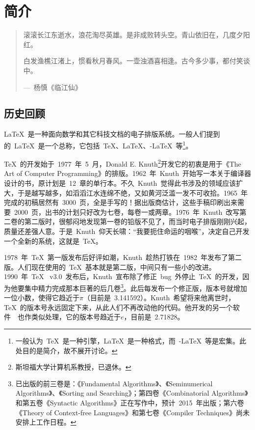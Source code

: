 \chapter{简介}

\begin{quotation}
滚滚长江东逝水，浪花淘尽英雄。是非成败转头空。青山依旧在，几度夕阳红。

白发渔樵江渚上，惯看秋月春风。一壶浊酒喜相逢。古今多少事，都付笑谈中。
\begin{flushright}
---~杨慎《临江仙》
\end{flushright}
\end{quotation}

\section{历史回顾}

\LaTeX~是一种面向数学和其它科技文档的电子排版系统。一般人们提到的~\LaTeX~是一个总称，它包括~\TeX、\LaTeX、\AmS-\LaTeX~等\footnote{一般认为~\TeX~是一种引擎，\LaTeX~是一种格式，而~\AmS-\LaTeX~等是宏集。此处目的是简介，故不展开讨论。}。

\TeX~的开发始于~1977~年~5~月，Donald E. Knuth\footnote{斯坦福大学计算机系教授，已退休。}开发它的初衷是用于《The Art of Computer Programming》的排版。1962~年~Knuth~开始写一本关于编译器设计的书，原计划是~12~章的单行本。不久~Knuth~觉得此书涉及的领域应该扩大，于是越写越多，如滔滔江水连绵不绝，又如黄河泛滥一发不可收拾。1965~年完成的初稿居然有~3000~页，全是手写的！据出版商估计，这些手稿印刷出来需要~2000~页，出书的计划只好改为七卷，每卷一或两章。1976~年~Knuth~改写第二卷的第二版时，很郁闷地发现第一卷的铅版不见了，而当时电子排版刚刚兴起，质量还差强人意。于是~Knuth~仰天长啸：“我要扼住命运的咽喉”，决定自己开发一个全新的系统，这就是~\TeX。

1978~年~\TeX~第一版发布后好评如潮，Knuth~趁热打铁在~1982~年发布了第二版。人们现在使用的~\TeX~基本就是第二版，中间只有一些小的改进。1990~年~\TeX~ v3.0~发布后，Knuth~宣布除了修正~bug~外停止~\TeX~的开发，因为他要集中精力完成那本巨著的后几卷\footnote{已出版的前三卷是：《Fundamental Algorithms》、《Seminumerical Algorithms》、《Sorting and Searching》；第四卷《Combinatorial Algorithms》和第五卷《Syntactic Algorithms》正在写作中，预计~2015~年出版；第六卷《Theory of Context-free Languages》和第七卷《Compiler Techniques》尚未安排上工作日程。}。此后每发布一个修正版，版本号就增加一位小数，使得它趋近于$\pi$（目前是~3.141592）。Knuth~希望将来他离世时，\TeX~的版本号永远固定下来，从此人们不再改动他的代码。他开发的另一个软件~\MF~也作类似处理，它的版本号趋近于$e$，目前是~2.71828。


